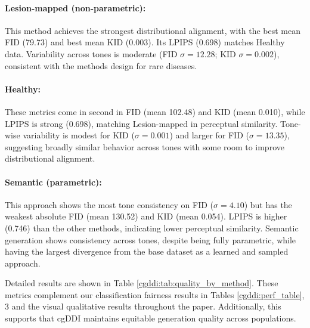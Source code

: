 \documentclass[11pt]{ucthesis}
\begin{document}
\paragraph{Lesion-mapped (non-parametric):} This method achieves the strongest distributional alignment, with the best mean FID (79.73) and best mean KID (0.003). Its LPIPS (0.698) matches Healthy data. Variability across tones is moderate (FID $\sigma = 12.28$; KID $\sigma = 0.002$), consistent with the methods design for rare diseases.

\paragraph{Healthy:} These metrics come in second in FID (mean 102.48) and KID (mean 0.010), while LPIPS is strong (0.698), matching Lesion-mapped in perceptual similarity. Tone-wise variability is modest for KID ($\sigma = 0.001$) and larger for FID ($\sigma = 13.35$), suggesting broadly similar behavior across tones with some room to improve distributional alignment.

\paragraph{Semantic (parametric):} This approach shows the most tone consistency on FID ($\sigma = 4.10$) but has the weakest absolute FID (mean 130.52) and KID (mean 0.054). LPIPS is higher (0.746) than the other methods, indicating lower perceptual similarity. Semantic generation shows consistency across tones, despite being fully parametric, while having the largest divergence from the base dataset as a learned and sampled approach.

Detailed results are shown in Table \ref{cgddi:tab:quality_by_method}. These metrics complement our classification fairness results in Tables \ref{cgddi:perf_table}, 3 and the visual qualitative results throughout the paper. Additionally, this supports that cgDDI maintains equitable generation quality across populations.
\end{document}
